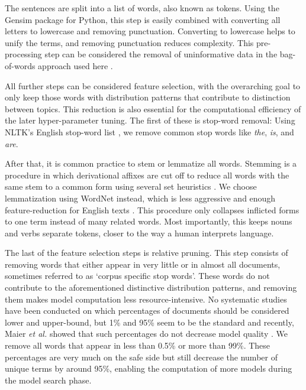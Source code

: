 \documentclass[runningheads]{llncs}
\begin{document}
The sentences are split into a list of words, also known as tokens. Using the Gensim package \cite{rehurek_gensimpython_2011} for Python, this step is easily combined with converting all letters to lowercase and removing punctuation. Converting to lowercase helps to unify the terms, and removing punctuation reduces complexity. This pre-processing step can be considered the removal of uninformative data in the bag-of-words approach used here \cite{scott1999feature}.

All further steps can be considered feature selection, with the overarching goal to only keep those words with distribution patterns that contribute to distinction between topics. This reduction is also essential for the computational efficiency of the later hyper-parameter tuning. The first of these is stop-word removal: Using NLTK’s English stop-word list \cite{bird_natural_2009}, we remove common stop words like \textit{the}, \textit{is}, and \textit{are}. 

After that, it is common practice to stem or lemmatize all words. Stemming is a procedure in which derivational affixes are cut off to reduce all words with the same stem to a common form using several set heuristics \cite{lovins_development_nodate}. We choose lemmatization using WordNet \cite{miller_wordnet_1995} instead, which is less aggressive and enough feature-reduction for English texts \cite{haselmayer2014measuring}. This procedure only collapses inflicted forms to one term instead of many related words. Most importantly, this keeps nouns and verbs separate tokens, closer to the way a human interprets language.

The last of the feature selection steps is relative pruning. This step consists of removing words that either appear in very little or in almost all documents, sometimes referred to as ‘corpus specific stop words’. These words do not contribute to the aforementioned distinctive distribution patterns, and removing them makes model computation less resource-intensive. No systematic studies have been conducted on which percentages of documents should be considered lower and upper-bound, but 1\% and 95\% seem to be the standard \cite{grimmer2013text,denny2018text} and recently, Maier \textit{et al.} showed that such percentages do not decrease model quality \cite{maier_how_2020}. We remove all words that appear in less than 0.5\% or more than 99\%. These percentages are very much on the safe side but still decrease the number of unique terms by around 95\%, enabling the computation of more models during the model search phase.
\end{document}
